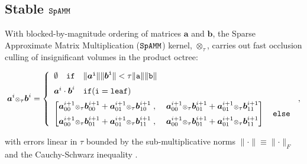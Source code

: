 \documentclass[letterpaper,twocolumn,amsmath,amsfont,amssymb,english,aps,jcp,preprintnumbers,groupaddress,nofootinbib,tightenlines]{revtex4}
\newcommand{\mat}[1]{\boldsymbol{#1}}
\newcommand{\ot}{ {\scriptstyle \otimes}_{ \tau } }
\begin{document}
\subsection{Stable $\tt SpAMM$}

With blocked-by-magnitude ordering of matrices $\mat{a}$ and
$\mat{b}$, the Sparse Approximate Matrix Multiplication ($\tt SpAMM$)
kernel, $\ot$, carries out fast occlusion culling of insignificant
volumes in the product octree:
\begin{widetext}
\begin{equation}
\mat{a}^{i} \ot \mat{b}^{i} =
\left\{
        \begin{array}{ll}
                 \emptyset \quad \tt{if}\quad \lVert \mat{a}^i \rVert \lVert \mat{b}^i \rVert < \tau \lVert a \rVert \lVert b \rVert \\[0.2cm]
                 \mat{a} ^i \cdot \mat{b}^i \quad  \tt{if}(i=\tt{leaf}) \\[0.2cm]
\begin{bmatrix} \mat{a}^{i+1}_{00} \ot \mat{b}^{i+1}_{00} +\mat{a}^{i+1}_{01} \ot \mat{b}^{i+1}_{10} \; , \; &
                \mat{a}^{i+1}_{00} \ot \mat{b}^{i+1}_{01} +\mat{a}^{i+1}_{01} \ot \mat{b}^{i+1}_{11}  \\[0.2cm]
                \mat{a}^{i+1}_{00} \ot \mat{b}^{i+1}_{01} +\mat{a}^{i+1}_{01} \ot \mat{b}^{i+1}_{11} \; , \; &
                \mat{a}^{i+1}_{00} \ot \mat{b}^{i+1}_{01} +\mat{a}^{i+1}_{01} \ot \mat{b}^{i+1}_{11}
\end{bmatrix}  \quad \tt{else}
                \end{array}
              \right.  \, ,
\end{equation}
\end{widetext}
with errors linear in $\tau$ bounded by the sub-multiplicative norms
$\lVert \cdot \rVert \equiv \lVert \cdot \rVert_F$ and the
Cauchy-Schwarz inequality \cite{kahan,}.
\end{document}
